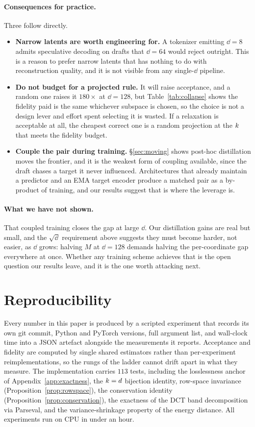 \paragraph{Consequences for practice.} Three follow directly.
\begin{itemize}
\itemsep2pt
\item \textbf{Narrow latents are worth engineering for.} A tokenizer emitting $\dd = 8$ admits
speculative decoding on drafts that $\dd = 64$ would reject outright. This is a reason to prefer
narrow latents that has nothing to do with reconstruction quality, and it is not visible from any
single-$\dd$ pipeline.
\item \textbf{Do not budget for a projected rule.} It will raise acceptance, and a random one raises it
$180\times$ at $\dd{=}128$, but Table~\ref{tab:collapse} shows the fidelity paid is the same
whichever subspace is chosen, so the choice is not a design lever and effort spent selecting it is
wasted. If a relaxation is acceptable at all, the cheapest correct one is a random projection at the
$k$ that meets the fidelity budget.
\item \textbf{Couple the pair during training.} \S\ref{sec:moving} shows post-hoc distillation moves
the frontier, and it is the weakest form of coupling available, since the draft chases a target it never
influenced. Architectures that already maintain a predictor and an EMA target encoder produce a
matched pair as a by-product of training, and our results suggest that is where the leverage is.
\end{itemize}

\paragraph{What we have not shown.} That coupled training closes the gap at large $\dd$. Our
distillation gains are real but small, and the $\sqrt{\dd}$ requirement above suggests they must
become harder, not easier, as $\dd$ grows: halving $M$ at $\dd = 128$ demands halving the
per-coordinate gap everywhere at once. Whether any training scheme achieves that is the open
question our results leave, and it is the one worth attacking next.

\section{Reproducibility}
\label{app:repro}

Every number in this paper is produced by a scripted experiment that records its own git commit,
Python and PyTorch versions, full argument list, and wall-clock time into a JSON artefact alongside
the measurements it reports. Acceptance and fidelity are computed by single shared estimators rather than
per-experiment reimplementations, so the rungs of the ladder cannot drift apart in what they measure.
The implementation carries $113$ tests, including the losslessness anchor of
Appendix~\ref{app:exactness}, the $k = d$ bijection identity, row-space invariance
(Proposition~\ref{prop:rowspace}), the conservation identity (Proposition~\ref{prop:conservation}),
the exactness of the DCT band decomposition via Parseval, and the variance-shrinkage property of the
energy distance. All experiments run on CPU in under an hour.
